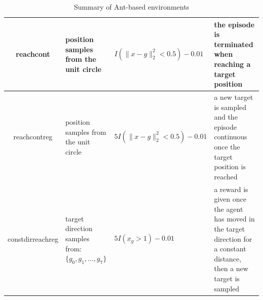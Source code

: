 \begin{table}[!htbp]
\begin{center}
\begin{tabular}{|c|p{3cm}|p{4cm}|p{4cm}|}
reachcont & position samples from the unit circle & $I(\lVert x-g\rVert_2^2<0.5) - 0.01$  & the episode is terminated when reaching a target position\\ \hline
reachcontreg & position samples from the unit circle & $5I(\lVert x-g\rVert_2^2<0.5) - 0.01$  & a new target is sampled and the episode continuous once the target position is reached\\ \hline
constdirreachreg & target direction samples from: $\{g_0,g_1, \dots,g_7\}$ & $5I(x_g > 1) - 0.01$  & a reward is given once the agent has moved in the target direction for a constant distance, then a new target is sampled\\ \hline
\end{tabular}
\end{center}
 \caption{Summary of Ant-based environments}
\end{table}\label{table_ant_envs}
